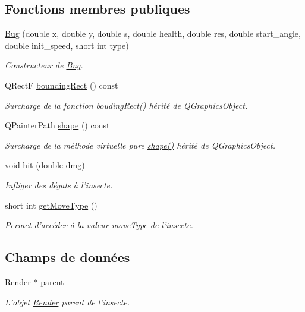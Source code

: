 \subsection*{Fonctions membres publiques}
\begin{DoxyCompactItemize}
\item 
\hyperlink{classBug_a1d3140d50abd44257d5e0b1b6dcb4514}{Bug} (double x, double y, double s, double health, double res, double start\_\-angle, double init\_\-speed, short int type)
\begin{DoxyCompactList}\small\item\em Constructeur de \hyperlink{classBug}{Bug}. \end{DoxyCompactList}\item 
QRectF \hyperlink{classBug_a9b39c25361faad07b1bf2dd927d09dab}{boundingRect} () const 
\begin{DoxyCompactList}\small\item\em Surcharge de la fonction boudingRect() hérité de QGraphicsObject. \end{DoxyCompactList}\item 
QPainterPath \hyperlink{classBug_a587a36d3145c2b4dba6c689af22c65ac}{shape} () const 
\begin{DoxyCompactList}\small\item\em Surcharge de la méthode virtuelle pure \hyperlink{classBug_a587a36d3145c2b4dba6c689af22c65ac}{shape()} hérité de QGraphicsObject. \end{DoxyCompactList}\item 
void \hyperlink{classBug_a63402c05b5ba3fb034e41f1ced0e4b9f}{hit} (double dmg)
\begin{DoxyCompactList}\small\item\em Infliger des dégats à l'insecte. \end{DoxyCompactList}\item 
short int \hyperlink{classBug_aced471cedcfa855baddf4c827003e755}{getMoveType} ()
\begin{DoxyCompactList}\small\item\em Permet d'accéder à la valeur moveType de l'insecte. \end{DoxyCompactList}\end{DoxyCompactItemize}
\subsection*{Champs de données}
\begin{DoxyCompactItemize}
\item 
\hyperlink{classRender}{Render} $\ast$ \hyperlink{classBug_a7a93aae4e4b7a215c94ff85d0bd6e26d}{parent}
\begin{DoxyCompactList}\small\item\em L'objet \hyperlink{classRender}{Render} parent de l'insecte. \end{DoxyCompactList}\end{DoxyCompactItemize}
